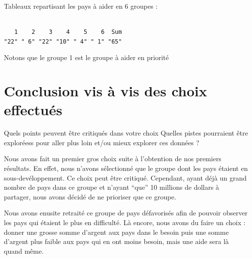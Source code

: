 \documentclass[
]{article}
\newenvironment{Shaded}{}{}
\newcommand{\AttributeTok}[1]{#1}
\newcommand{\CommentTok}[1]{\textcolor[rgb]{0.00,0.50,0.00}{#1}}
\newcommand{\ConstantTok}[1]{#1}
\newcommand{\DecValTok}[1]{#1}
\newcommand{\FunctionTok}[1]{#1}
\newcommand{\NormalTok}[1]{#1}
\newcommand{\OtherTok}[1]{\textcolor[rgb]{1.00,0.25,0.00}{#1}}
\newcommand{\SpecialCharTok}[1]{\textcolor[rgb]{0.00,0.50,0.50}{#1}}
\begin{document}
Tableaux repartisant les pays à aider en 6 groupes :

\begin{Shaded}
\end{Shaded}

\begin{verbatim}

   1    2    3    4    5    6  Sum 
"22" " 6" "22" "10" " 4" " 1" "65" 
\end{verbatim}

Notons que le groupe 1 est le groupe à aider en priorité

\hypertarget{conclusion-vis-uxe0-vis-des-choix-effectuuxe9s}{%
\section{Conclusion vis à vis des choix
effectués}\label{conclusion-vis-uxe0-vis-des-choix-effectuuxe9s}}

Quels points peuvent être critiqués dans votre choix Quelles pistes
pourraient être exploréess pour aller plus loin et/ou mieux explorer ces
données ?

Nous avons fait un premier gros choix suite à l'obtention de nos
premiers résultats. En effet, nous n'avons sélectionné que le groupe
dont les pays étaient en sous-devéloppement. Ce choix peut être
critiqué. Cependant, ayant déjà un grand nombre de pays dans ce groupe
et n'ayant ``que'' 10 millions de dollars à partager, nous avons décidé
de ne prioriser que ce groupe.

Nous avons enusite retraité ce groupe de pays défavorisés afin de
pouvoir observer les pays qui étaient le plus en difficulté. Là encore,
nous avons du faire un choix : donner une grosse somme d'argent aux pays
dans le besoin puis une somme d'argent plus faible aux pays qui en ont
moins besoin, mais une aide sera là quand même.
\end{document}
